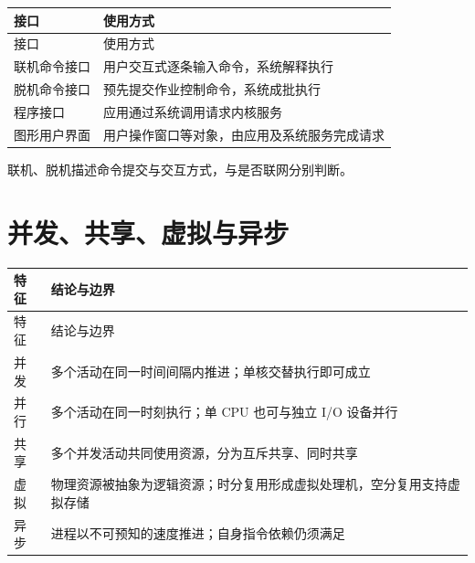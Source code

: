 \par\smallskip
{\fontsize{9.3}{12}\selectfont\setlength{\tabcolsep}{2.5pt}\setlength{\LTleft}{0pt}\setlength{\LTright}{0pt}
\begin{longtable}{@{}>{\raggedright\arraybackslash}p{}>{\raggedright\arraybackslash}p{}@{}}
\toprule
接口 & 使用方式 \\

\midrule\endfirsthead\toprule
接口 & 使用方式 \\

\midrule\endhead\bottomrule\endfoot
联机命令接口 & 用户交互式逐条输入命令，系统解释执行 \\

脱机命令接口 & 预先提交作业控制命令，系统成批执行 \\

程序接口 & 应用通过系统调用请求内核服务 \\

图形用户界面 & 用户操作窗口等对象，由应用及系统服务完成请求 \\

\end{longtable}}
\par\smallskip

联机、脱机描述命令提交与交互方式，与是否联网分别判断。

\section{并发、共享、虚拟与异步}\label{OS01-features}

\par\smallskip
{\fontsize{9.3}{12}\selectfont\setlength{\tabcolsep}{2.5pt}\setlength{\LTleft}{0pt}\setlength{\LTright}{0pt}
\begin{longtable}{@{}>{\raggedright\arraybackslash}p{}>{\raggedright\arraybackslash}p{}@{}}
\toprule
特征 & 结论与边界 \\

\midrule\endfirsthead\toprule
特征 & 结论与边界 \\

\midrule\endhead\bottomrule\endfoot
并发 & 多个活动在同一时间间隔内推进；单核交替执行即可成立 \\

并行 & 多个活动在同一时刻执行；单 CPU 也可与独立 I/O 设备并行 \\

共享 & 多个并发活动共同使用资源，分为互斥共享、同时共享 \\

虚拟 & 物理资源被抽象为逻辑资源；时分复用形成虚拟处理机，空分复用支持虚拟存储 \\

异步 & 进程以不可预知的速度推进；自身指令依赖仍须满足 \\

\end{longtable}}
\par\smallskip

